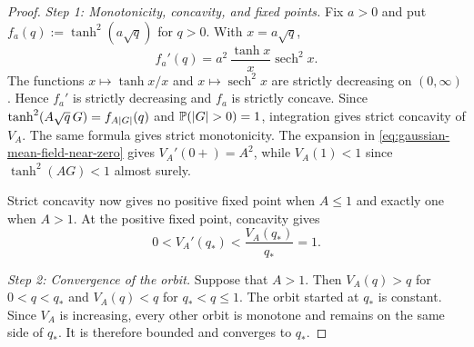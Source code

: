 \documentclass[11pt,reqno,a4paper]{article}
\newcommand{\Pp}{\P}
\begin{document}
\begin{proof}
  \emph{Step 1: Monotonicity, concavity, and fixed points.}
  Fix $a>0$ and put $f_a(q):=\tanh^2(a\sqrt q)$ for $q>0$. With
  $x=a\sqrt q$,
  \begin{equation*}
    f_a'(q)
    =
    a^2\,\frac{\tanh x}{x}\operatorname{sech}^2 x.
  \end{equation*}
  The functions $x\mapsto\tanh x/x$ and
  $x\mapsto\operatorname{sech}^2x$ are strictly decreasing on
  $(0,\infty)$. Hence $f_a'$ is strictly decreasing and $f_a$ is strictly
  concave. Since
  $\tanh^2(A\sqrt q\,G)=f_{A\abs G}(q)$ and $\Pp(\abs G>0)=1$, integration
  gives strict concavity of $V_A$. The same formula gives strict
  monotonicity. The expansion in \cref{eq:gaussian-mean-field-near-zero} gives
  $V_A'(0+)=A^2$, while $V_A(1)<1$ since
  $\tanh^2(AG)<1$ almost surely.

  Strict concavity now gives no positive fixed point when $A\leq1$ and exactly
  one when $A>1$. At the positive fixed point,
  concavity gives
  \begin{equation*}
    0<V_A'(q_\ast)<\frac{V_A(q_\ast)}{q_\ast}=1.
  \end{equation*}

  \emph{Step 2: Convergence of the orbit.}
  Suppose that $A>1$. Then $V_A(q)>q$ for $0<q<q_\ast$ and
  $V_A(q)<q$ for $q_\ast<q\leq1$. The orbit started at $q_\ast$ is constant.
  Since $V_A$ is increasing, every other orbit is monotone and remains on the
  same side of $q_\ast$. It is therefore bounded and converges to $q_\ast$.


\end{proof}
\end{document}
